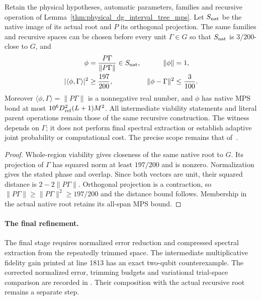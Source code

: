 \begin{lemma}
    \label{lem:physical_dg_tree_unit_mps}
    \leanok
    Retain the physical hypotheses, automatic parameters, families and
    recursive operation of Lemma~\ref{thm:physical_dg_interval_tree_mps}.
    Let $S_{\rm nat}$ be the native image of its actual root and
    $P$ its orthogonal projection. The same families and recursive spaces
    can be chosen before every unit $\Gamma\in G$ so that
    $S_{\rm nat}$ is $3/200$-close to $G$, and
    \begin{align}
        \phi                          & =\frac{P\Gamma}{\|P\Gamma\|}\in S_{\rm nat}, &
        \|\phi\|                      & =1,\notag                                      \\
        |\langle\phi,\Gamma\rangle|^2 & \ge\frac{197}{200},                          &
        \|\phi-\Gamma\|^2             & \le\frac3{100}.
    \end{align}
    Moreover $\langle\phi,\Gamma\rangle=\|P\Gamma\|$ is a nonnegative
    real number, and $\phi$ has native MPS bond at most
    $10^6D_{\rm ref}^2(L+1)M^2$.
    All intermediate viability statements and literal parent operations
    remain those of the same recursive construction. The witness depends
    on $\Gamma$; it does not perform final spectral extraction or establish
    adaptive joint probability or computational cost. The precise scope
    remains that of~\cite{gap:alvv16_approximation_parameters}.
\end{lemma}
\begin{proof}\leanok
    Whole-region viability gives closeness of the same native root to $G$.
    Its projection of $\Gamma$ has squared norm at least $197/200$ and
    is nonzero. Normalization gives the stated phase and overlap. Since
    both vectors are unit, their squared distance is
    $2-2\|P\Gamma\|$. Orthogonal projection is a contraction, so
    $\|P\Gamma\|\ge\|P\Gamma\|^2\ge197/200$ and the distance
    bound follows. Membership in the actual native root
    retains its all-span MPS bound.
\end{proof}

\paragraph{The final refinement.}
The final stage requires normalized error reduction and compressed
spectral extraction from the repeatedly trimmed space. The intermediate
multiplicative fidelity gain printed at line 1813 has an exact two-qubit
counterexample. The corrected normalized error, trimming budgets and
variational trial-space comparison are recorded in
\cite{gap:alvv16_final_filter_gain}. Their composition with the actual
recursive root remains a separate step.

